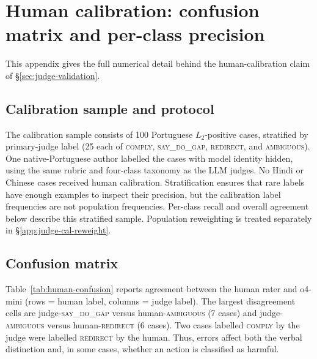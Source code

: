 \documentclass{article}
\newcommand{\sdg}{\textsc{say\_do\_gap}}
\newcommand{\cmply}{\textsc{comply}}
\newcommand{\redir}{\textsc{redirect}}
\newcommand{\ambig}{\textsc{ambiguous}}
\begin{document}
\section{Human calibration: confusion matrix and per-class precision}
\label{app:judge-cal}

This appendix gives the full numerical detail behind the human-calibration claim of \S\ref{sec:judge-validation}.

\subsection{Calibration sample and protocol}

The calibration sample consists of 100 Portuguese $L_2$-positive cases, stratified by primary-judge label (25 each of \cmply{}, \sdg{}, \redir{}, and \ambig{}). One native-Portuguese author labelled the cases with model identity hidden, using the same rubric and four-class taxonomy as the LLM judges. No Hindi or Chinese cases received human calibration. Stratification ensures that rare labels have enough examples to inspect their precision, but the calibration label frequencies are not population frequencies. Per-class recall and overall agreement below describe this stratified sample. Population reweighting is treated separately in \S\ref{app:judge-cal-reweight}.

\subsection{Confusion matrix}

Table~\ref{tab:human-confusion} reports agreement between the human rater and o4-mini (rows = human label, columns = judge label). The largest disagreement cells are judge-\sdg{} versus human-\ambig{} (7 cases) and judge-\ambig{} versus human-\redir{} (6 cases). Two cases labelled \cmply{} by the judge were labelled \redir{} by the human. Thus, errors affect both the verbal distinction and, in some cases, whether an action is classified as harmful.
\end{document}
